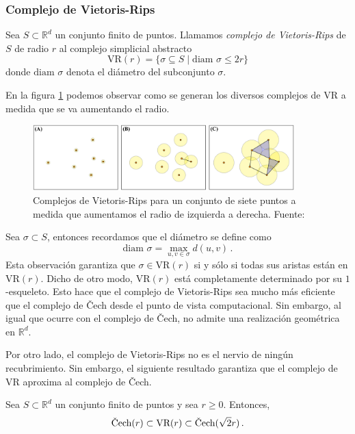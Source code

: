 \subsubsection*{Complejo de Vietoris-Rips}

\begin{definition}
Sea $S \subset \mathbb{R}^d$ un conjunto finito de puntos. Llamamos \emph{complejo de Vietoris-Rips} de $S$ de radio $r$ al complejo simplicial abstracto
\[
\text{VR}(r) = \{\sigma \subseteq  S \mid \textrm{diam } \sigma \leq 2r\}
\]
donde $\textrm{diam } \sigma$ denota el diámetro del subconjunto $\sigma$.
\end{definition}

En la figura \ref{ref:vr} podemos observar como se generan los diversos complejos de VR a medida que se va aumentando el radio.

\begin{figure}[!ht]
\centering
\includegraphics[width=0.9\textwidth]{include/figuras/vr.png} 
\caption{Complejos de Vietoris-Rips para un conjunto de siete puntos a medida que aumentamos el radio de izquierda a derecha. Fuente: \cite{Ulmer2019}}
\label{ref:vr}
\end{figure}


Sea $\sigma \subset S$, entonces recordamos que el diámetro se define como
\[\textrm{diam } \sigma = \max_{u, v \in \sigma} d(u,v)\,.\]
Esta observación garantiza que $\sigma \in \text{VR}(r)$ si y sólo si todas sus aristas están en $\text{VR}(r)$. Dicho de otro modo, $\text{VR}(r)$ está completamente determinado por su $1$-esqueleto. Esto hace que el complejo de Vietoris-Rips sea mucho más eficiente que el complejo de \v{C}ech desde el punto de vista computacional. Sin embargo, al igual que ocurre con el complejo de \v{C}ech, no admite una realización geométrica en $\mathbb{R}^d$.

Por otro lado, el complejo de Vietoris-Rips no es el nervio de ningún recubrimiento. Sin embargo, el siguiente resultado garantiza que el complejo de VR aproxima al complejo de \v{C}ech.

\begin{lemma}
\label{ref:lemaVR}
Sea $S \subset \mathbb{R}^d$ un conjunto finito de puntos y sea $r \geq 0$. Entonces,
\[
\text{\rm \v{C}ech}(r) \subset \text{\rm VR}(r) \subset \text{\rm \v{C}ech}(\sqrt{2}r)\,.
\]
\end{lemma}

